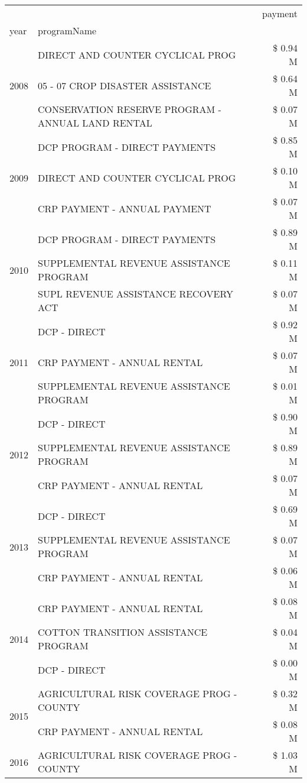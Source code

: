 \begin{tabular}{llr}
\toprule
 &  & payment \\
year & programName &  \\
\midrule
\multirow[t]{3}{*}{2008} & DIRECT AND COUNTER CYCLICAL PROG & \$ 0.94 M \\
 & 05 - 07 CROP DISASTER ASSISTANCE & \$ 0.64 M \\
 & CONSERVATION RESERVE PROGRAM - ANNUAL LAND RENTAL & \$ 0.07 M \\
\cline{1-3}
\multirow[t]{3}{*}{2009} & DCP PROGRAM - DIRECT PAYMENTS & \$ 0.85 M \\
 & DIRECT AND COUNTER CYCLICAL PROG & \$ 0.10 M \\
 & CRP PAYMENT - ANNUAL PAYMENT & \$ 0.07 M \\
\cline{1-3}
\multirow[t]{3}{*}{2010} & DCP PROGRAM - DIRECT PAYMENTS & \$ 0.89 M \\
 & SUPPLEMENTAL REVENUE ASSISTANCE PROGRAM & \$ 0.11 M \\
 & SUPL REVENUE ASSISTANCE RECOVERY ACT & \$ 0.07 M \\
\cline{1-3}
\multirow[t]{3}{*}{2011} & DCP - DIRECT & \$ 0.92 M \\
 & CRP PAYMENT - ANNUAL RENTAL & \$ 0.07 M \\
 & SUPPLEMENTAL REVENUE ASSISTANCE PROGRAM & \$ 0.01 M \\
\cline{1-3}
\multirow[t]{3}{*}{2012} & DCP - DIRECT & \$ 0.90 M \\
 & SUPPLEMENTAL REVENUE ASSISTANCE PROGRAM & \$ 0.89 M \\
 & CRP PAYMENT - ANNUAL RENTAL & \$ 0.07 M \\
\cline{1-3}
\multirow[t]{3}{*}{2013} & DCP - DIRECT & \$ 0.69 M \\
 & SUPPLEMENTAL REVENUE ASSISTANCE PROGRAM & \$ 0.07 M \\
 & CRP PAYMENT - ANNUAL RENTAL & \$ 0.06 M \\
\cline{1-3}
\multirow[t]{3}{*}{2014} & CRP PAYMENT - ANNUAL RENTAL & \$ 0.08 M \\
 & COTTON TRANSITION ASSISTANCE PROGRAM & \$ 0.04 M \\
 & DCP - DIRECT & \$ 0.00 M \\
\cline{1-3}
\multirow[t]{2}{*}{2015} & AGRICULTURAL RISK COVERAGE PROG - COUNTY & \$ 0.32 M \\
 & CRP PAYMENT - ANNUAL RENTAL & \$ 0.08 M \\
\cline{1-3}
\multirow[t]{3}{*}{2016} & AGRICULTURAL RISK COVERAGE PROG - COUNTY & \$ 1.03 M \\

\end{tabular}
